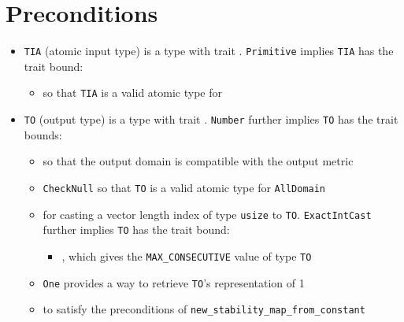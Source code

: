\documentclass{article}
\begin{document}
\section{Preconditions}
\begin{itemize}

    \item \texttt{TIA} (atomic input type) is a type with trait . \texttt{Primitive} implies \texttt{TIA} has the trait bound:
    \begin{itemize}
        \item {} so that \texttt{TIA} is a valid atomic type for 
    \end{itemize}

    \item \texttt{TO} (output type) is a type with trait . \texttt{Number} further implies \texttt{TO} has the trait bounds:
    \begin{itemize}
        \item {} so that the output domain is compatible with the output metric
        \item \texttt{CheckNull} so that \texttt{TO} is a valid atomic type for \texttt{AllDomain}
        \item {} for casting a vector length index of type \texttt{usize} to \texttt{TO}. \texttt{ExactIntCast} further implies \texttt{TO} has the trait bound:
        \begin{itemize}
            \item {}, which gives the \texttt{MAX\_CONSECUTIVE} value of type \texttt{TO}
        \end{itemize}
        
        \item \texttt{One} provides a way to retrieve \texttt{TO}'s representation of 1
        \item {} to satisfy the preconditions of \texttt{new\_stability\_map\_from\_constant}
    \end{itemize}
\end{itemize}
\end{document}
